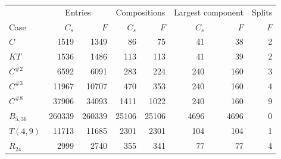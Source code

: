 \begin{tabular}{@{}lrrrrrrr@{}}
\toprule
& \multicolumn{2}{c}{Entries} & \multicolumn{2}{c}{Compositions} & \multicolumn{2}{c}{Largest component} & Splits\\
Case & $C_s$ & $F$ & $C_s$ & $F$ & $C_s$ & $F$ & $F$\\\midrule
$C$ & 1519 & 1349 & 86 & 75 & 41 & 38 & 2\\
$KT$ & 1536 & 1486 & 113 & 113 & 41 & 39 & 2\\
$C^{\#2}$ & 6592 & 6091 & 283 & 224 & 240 & 160 & 3\\
$C^{\#3}$ & 11967 & 10707 & 470 & 353 & 240 & 160 & 4\\
$C^{\#8}$ & 37906 & 34093 & 1411 & 1022 & 240 & 160 & 9\\
$B_{5,36}$ & 260339 & 260339 & 25106 & 25106 & 4696 & 4696 & 0\\
$T(4,9)$ & 11713 & 11685 & 2301 & 2301 & 104 & 104 & 1\\
$R_{24}$ & 2999 & 2740 & 355 & 341 & 77 & 77 & 4\\
\bottomrule
\end{tabular}
